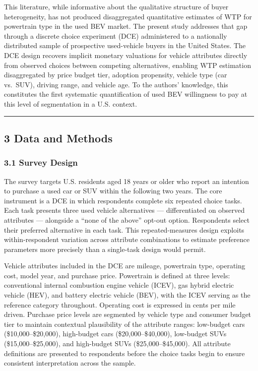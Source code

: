 \documentclass[
  letterpaper,
  DIV=11,
  numbers=noendperiod]{scrartcl}
\begin{document}
This literature, while informative about the qualitative structure of
buyer heterogeneity, has not produced disaggregated quantitative
estimates of WTP for powertrain type in the used BEV market. The present
study addresses that gap through a discrete choice experiment (DCE)
administered to a nationally distributed sample of prospective
used-vehicle buyers in the United States. The DCE design recovers
implicit monetary valuations for vehicle attributes directly from
observed choices between competing alternatives, enabling WTP estimation
disaggregated by price budget tier, adoption propensity, vehicle type
(car vs.~SUV), driving range, and vehicle age. To the authors'
knowledge, this constitutes the first systematic quantification of used
BEV willingness to pay at this level of segmentation in a U.S. context.

\begin{center}\rule{0.5\linewidth}{0.5pt}\end{center}

\subsection{3 Data and Methods}\label{data-and-methods}

\subsubsection{3.1 Survey Design}\label{survey-design}

The survey targets U.S. residents aged 18 years or older who report an
intention to purchase a used car or SUV within the following two years.
The core instrument is a DCE in which respondents complete six repeated
choice tasks. Each task presents three used vehicle alternatives ---
differentiated on observed attributes --- alongside a ``none of the
above'' opt-out option. Respondents select their preferred alternative
in each task. This repeated-measures design exploits within-respondent
variation across attribute combinations to estimate preference
parameters more precisely than a single-task design would permit.

Vehicle attributes included in the DCE are mileage, powertrain type,
operating cost, model year, and purchase price. Powertrain is defined at
three levels: conventional internal combustion engine vehicle (ICEV),
gas hybrid electric vehicle (HEV), and battery electric vehicle (BEV),
with the ICEV serving as the reference category throughout. Operating
cost is expressed in cents per mile driven. Purchase price levels are
segmented by vehicle type and consumer budget tier to maintain
contextual plausibility of the attribute ranges: low-budget cars
(\$10,000--\$20,000), high-budget cars (\$20,000--\$40,000), low-budget
SUVs (\$15,000--\$25,000), and high-budget SUVs (\$25,000--\$45,000).
All attribute definitions are presented to respondents before the choice
tasks begin to ensure consistent interpretation across the sample.
\end{document}
